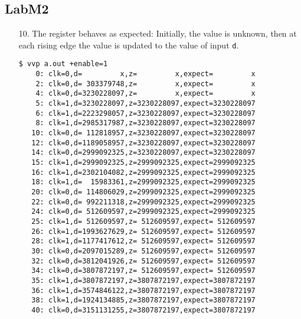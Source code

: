\documentclass{article}
\begin{document}
\subsection{LabM2}
\begin{enumerate}
\item[10. ] The register behaves as expected: Initially, the value is unknown,
then at each rising edge the value is updated to the value of input \verb$d$.
\begin{verbatim}
$ vvp a.out +enable=1
    0: clk=0,d=         x,z=         x,expect=         x
    2: clk=0,d= 303379748,z=         x,expect=         x
    4: clk=0,d=3230228097,z=         x,expect=         x
    5: clk=1,d=3230228097,z=3230228097,expect=3230228097
    6: clk=1,d=2223298057,z=3230228097,expect=3230228097
    8: clk=1,d=2985317987,z=3230228097,expect=3230228097
   10: clk=0,d= 112818957,z=3230228097,expect=3230228097
   12: clk=0,d=1189058957,z=3230228097,expect=3230228097
   14: clk=0,d=2999092325,z=3230228097,expect=3230228097
   15: clk=1,d=2999092325,z=2999092325,expect=2999092325
   16: clk=1,d=2302104082,z=2999092325,expect=2999092325
   18: clk=1,d=  15983361,z=2999092325,expect=2999092325
   20: clk=0,d= 114806029,z=2999092325,expect=2999092325
   22: clk=0,d= 992211318,z=2999092325,expect=2999092325
   24: clk=0,d= 512609597,z=2999092325,expect=2999092325
   25: clk=1,d= 512609597,z= 512609597,expect= 512609597
   26: clk=1,d=1993627629,z= 512609597,expect= 512609597
   28: clk=1,d=1177417612,z= 512609597,expect= 512609597
   30: clk=0,d=2097015289,z= 512609597,expect= 512609597
   32: clk=0,d=3812041926,z= 512609597,expect= 512609597
   34: clk=0,d=3807872197,z= 512609597,expect= 512609597
   35: clk=1,d=3807872197,z=3807872197,expect=3807872197
   36: clk=1,d=3574846122,z=3807872197,expect=3807872197
   38: clk=1,d=1924134885,z=3807872197,expect=3807872197
   40: clk=0,d=3151131255,z=3807872197,expect=3807872197
\end{verbatim}
\end{enumerate}
\end{document}
